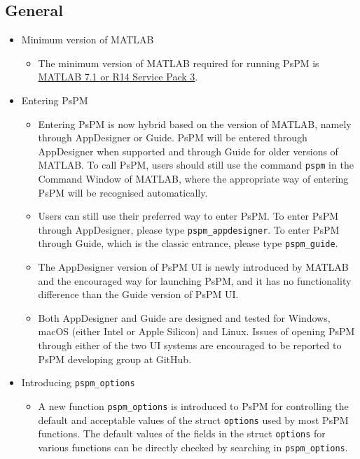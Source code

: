 \documentclass[english]{article}
\numberwithin{equation}{section}
\numberwithin{figure}{section}
\begin{document}
\subsection*{General}
	\begin{itemize}
		\item Minimum version of MATLAB
		\begin{itemize}
			\item The minimum version of MATLAB required for running PsPM is \href{https://uk.mathworks.com/content/dam/mathworks/mathworks-dot-com/support/sysreq/files/SystemRequirements-Release14-ServicePack3_SupportedCompilers.pdf}{MATLAB 7.1 or R14 Service Pack 3}.
		\end{itemize}
		\item Entering PsPM
		\begin{itemize}
			\item Entering PsPM is now hybrid based on the version of MATLAB, namely through AppDesigner or Guide. PsPM will be entered through AppDesigner when supported and through Guide for older versions of MATLAB. To call PsPM, users should still use the command \texttt{pspm} in the Command Window of MATLAB, where the appropriate way of entering PsPM will be recognised automatically.
			\item Users can still use their preferred way to enter PsPM. To enter PsPM through AppDesigner, please type \texttt{pspm\_appdesigner}. To enter PsPM through Guide, which is the classic entrance, please type \texttt{pspm\_guide}.
			\item The AppDesigner version of PsPM UI is newly introduced by MATLAB and the encouraged way for launching PsPM, and it has no functionality difference than the Guide version of PsPM UI.
			\item Both AppDesigner and Guide are designed and tested for Windows, macOS (either Intel or Apple Silicon) and Linux. Issues of opening PsPM through either of the two UI systems are encouraged to be reported to PsPM developing group at GitHub.
		\end{itemize}
		\item Introducing \texttt{pspm\_options}
		\begin{itemize}
			\item A new function \texttt{pspm\_options} is introduced to PsPM for controlling the default and acceptable values of the struct \texttt{options} used by most PsPM functions. The default values of the fields in the struct \texttt{options} for various functions can be directly checked by searching in \texttt{pspm\_options}.

\end{itemize}
\end{itemize}
\end{document}
